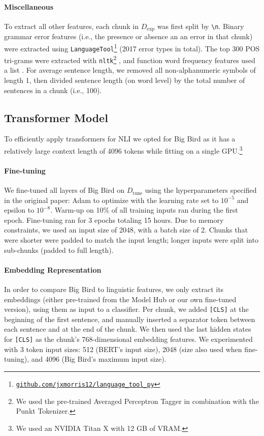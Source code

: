 \documentclass[10pt, a4paper]{article}
\begin{document}
\paragraph{Miscellaneous} To extract all other features, each chunk in $D_\text{exp}$ was first split by \texttt{\textbackslash n}. Binary grammar error features (i.e., the presence or absence an an error in that chunk) were extracted using  \texttt{LanguageTool}\footnote{\href{https://github.com/jxmorris12/language_tool_python}{\texttt{github.com/jxmorris12/language\_tool\_py}}} (2017 error types in total). The top 300 POS tri-grams were extracted with \texttt{nltk}\footnote{We used the pre-trained Averaged Perceptron Tagger in combination with the Punkt Tokenizer.} \cite{DBLP:journals/lre/Wagner10}, and function word frequency features used a list \cite[][467 total]{DBLP:journals/lalc/VolanskyOW15}. For average sentence length, we removed all non-alphanumeric symbols of length 1, then divided sentence length (on word level) by the total number of sentences in a chunk (i.e., 100).


\subsection{Transformer Model} \label{sec:transformer-models}

To efficiently apply transformers for NLI we opted for Big Bird \cite[\texttt{google/bigbird-roberta-base} on the Hugging Face Model Hub;][]{DBLP:conf/nips/PaszkeGMLBCKLGA19,transformers} as it has a relatively large context length of 4096 tokens while fitting on a single GPU.\footnote{We used an NVIDIA Titan X with 12 GB of VRAM.} 

\paragraph{Fine-tuning} We fine-tuned all layers of Big Bird on $D_\text{tune}$ using the hyperparameters specified in the original paper: Adam \cite{DBLP:journals/corr/KingmaB14} to optimize with the learning rate set to $10^{-5}$ and epsilon to $10^{-8}$. Warm-up on 10\% of all training inputs ran during the first epoch. Fine-tuning ran for 3 epochs totaling 15 hours. 
Due to memory constraints, we used an input size of 2048, with a batch size of 2. Chunks that were shorter were padded to match the input length; longer inputs were split into sub-chunks (padded to full length). 

\paragraph{Embedding Representation} In order to compare Big Bird to linguistic features, we only extract its embeddings (either pre-trained from the Model Hub or our own fine-tuned version), using them as input to a classifier. Per chunk, we added \texttt{[CLS]} at the beginning of the first sentence, and manually inserted a separator token between each sentence and at the end of the chunk.
We then used the last hidden states for \texttt{[CLS]} as the chunk's 768-dimensional embedding features. We experimented with 3 token input sizes: 512 (BERT's input size), 2048 (size also used when fine-tuning), and 4096  (Big Bird's maximum input size). 
\end{document}

